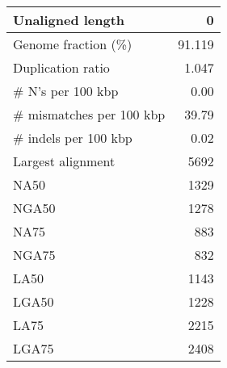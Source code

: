 \documentclass[12pt,a4paper]{article}
\begin{document}
\begin{table}[ht]
\begin{center}
\begin{tabular}{|l*{1}{|r}|}
Unaligned length & 0 \\ \hline
Genome fraction (\%) & 91.119 \\ \hline
Duplication ratio & 1.047 \\ \hline
\# N's per 100 kbp & 0.00 \\ \hline
\# mismatches per 100 kbp & 39.79 \\ \hline
\# indels per 100 kbp & 0.02 \\ \hline
Largest alignment & 5692 \\ \hline
NA50 & 1329 \\ \hline
NGA50 & 1278 \\ \hline
NA75 & 883 \\ \hline
NGA75 & 832 \\ \hline
LA50 & 1143 \\ \hline
LGA50 & 1228 \\ \hline
LA75 & 2215 \\ \hline
LGA75 & 2408 \\ \hline
\end{tabular}
\end{center}
\end{table}
\end{document}

